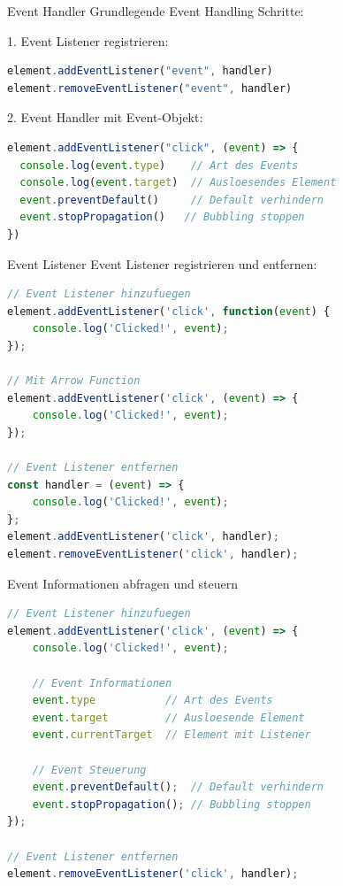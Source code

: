 \begin{KR}{Event Handler}
Grundlegende Event Handling Schritte:

1. Event Listener registrieren:
\begin{lstlisting}[language=JavaScript, style=basesmol]
element.addEventListener("event", handler)
element.removeEventListener("event", handler)
\end{lstlisting}

2. Event Handler mit Event-Objekt:
\begin{lstlisting}[language=JavaScript, style=basesmol]
element.addEventListener("click", (event) => {
  console.log(event.type)    // Art des Events
  console.log(event.target)  // Ausloesendes Element
  event.preventDefault()     // Default verhindern
  event.stopPropagation()   // Bubbling stoppen
})
\end{lstlisting}
\end{KR}

\begin{KR}{Event Listener}
Event Listener registrieren und entfernen:
\begin{lstlisting}[language=JavaScript, style=basesmol]
// Event Listener hinzufuegen
element.addEventListener('click', function(event) {
    console.log('Clicked!', event);
});

// Mit Arrow Function
element.addEventListener('click', (event) => {
    console.log('Clicked!', event);
});

// Event Listener entfernen
const handler = (event) => {
    console.log('Clicked!', event);
};
element.addEventListener('click', handler);
element.removeEventListener('click', handler);
\end{lstlisting}
\end{KR}

\begin{KR}{Event Informationen abfragen und steuern}
\begin{lstlisting}[language=JavaScript, style=basesmol]
// Event Listener hinzufuegen
element.addEventListener('click', (event) => {
    console.log('Clicked!', event);
    
    // Event Informationen
    event.type           // Art des Events
    event.target         // Ausloesende Element
    event.currentTarget  // Element mit Listener
    
    // Event Steuerung
    event.preventDefault();  // Default verhindern
    event.stopPropagation(); // Bubbling stoppen
});

// Event Listener entfernen
element.removeEventListener('click', handler);
\end{lstlisting}
\end{KR}




